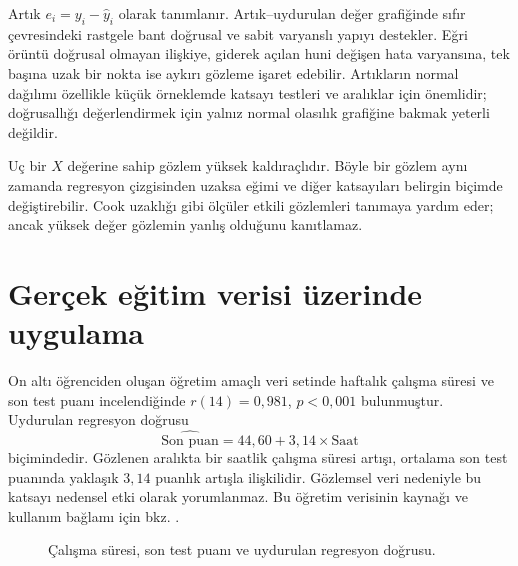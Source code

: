 Artık $e_i=y_i-\hat y_i$ olarak tanımlanır. Artık--uydurulan değer grafiğinde
sıfır çevresindeki rastgele bant doğrusal ve sabit varyanslı yapıyı destekler.
Eğri örüntü doğrusal olmayan ilişkiye, giderek açılan huni değişen hata
varyansına, tek başına uzak bir nokta ise aykırı gözleme işaret edebilir.
Artıkların normal dağılımı özellikle küçük örneklemde katsayı testleri ve
aralıklar için önemlidir; doğrusallığı değerlendirmek için yalnız normal
olasılık grafiğine bakmak yeterli değildir.

Uç bir $X$ değerine sahip gözlem yüksek kaldıraçlıdır. Böyle bir gözlem aynı
zamanda regresyon çizgisinden uzaksa eğimi ve diğer katsayıları belirgin
biçimde değiştirebilir. Cook uzaklığı gibi ölçüler etkili gözlemleri tanımaya
yardım eder; ancak yüksek değer gözlemin yanlış olduğunu kanıtlamaz.

\section{Gerçek eğitim verisi üzerinde uygulama}

On altı öğrenciden oluşan öğretim amaçlı veri setinde haftalık çalışma süresi
ve son test puanı incelendiğinde
$r(14)=0{,}981$, $p<0{,}001$ bulunmuştur. Uydurulan regresyon doğrusu
\[
\widehat{\text{Son puan}}=44{,}60+3{,}14\times\text{Saat}
\]
biçimindedir. Gözlenen aralıkta bir saatlik çalışma süresi artışı, ortalama
son test puanında yaklaşık $3{,}14$ puanlık artışla ilişkilidir. Gözlemsel
veri nedeniyle bu katsayı nedensel etki olarak yorumlanmaz.
Bu öğretim verisinin kaynağı ve kullanım bağlamı için bkz. \citet{gill2001}.

\begin{figure}[H]
\centering
{}
\caption{Çalışma süresi, son test puanı ve uydurulan regresyon doğrusu.}
\label{fig:simple-regression-scatter}
\end{figure}

